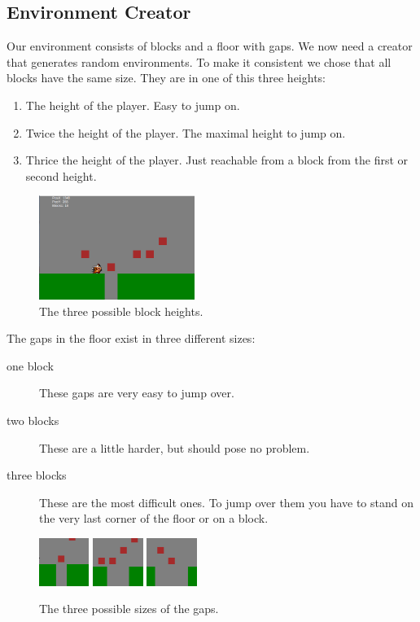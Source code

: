 \subsection{Environment Creator}
Our environment consists of blocks and a floor with gaps. We now need a creator that generates random environments. To make it consistent we chose that all blocks have the same size. They are in one of this three heights:
\begin{enumerate}
  \item The height of the player. Easy to jump on.
  \item Twice the height of the player. The maximal height to jump on.
  \item Thrice the height of the player. Just reachable from a block from the first or second height.
\end{enumerate}
\begin{figure}[H]
  \includegraphics[width=0.45\textwidth]{images/block_heights.png}
  \caption{The three possible block heights.}
\end{figure}
The gaps in the floor exist in three different sizes:
\begin{description}
  \item[one block] These gaps are very easy to jump over.
  \item[two blocks] These are a little harder, but should pose no problem.
  \item[three blocks] These are the most difficult ones. To jump over them you have to stand on the very last corner of the floor or on a block.
\end{description}
\begin{figure}[H]
  \includegraphics[width=0.145\textwidth]{images/gap_size1.png}
  \includegraphics[width=0.145\textwidth]{images/gap_size2.png}
  \includegraphics[width=0.145\textwidth]{images/gap_size3.png}
  \caption{The three possible sizes of the gaps.}
\end{figure}

